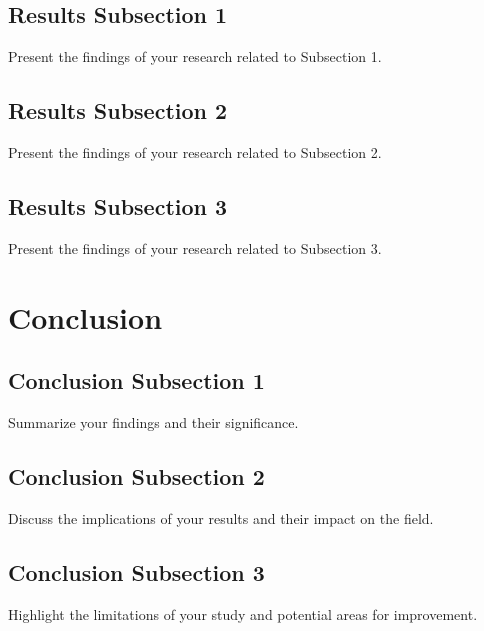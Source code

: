 \documentclass[12pt]{article}
\begin{document}
\subsection{Results Subsection 1}
\label{subsec:results1}

Present the findings of your research related to Subsection 1.

\subsection{Results Subsection 2}
\label{subsec:results2}

Present the findings of your research related to Subsection 2.

\subsection{Results Subsection 3}
\label{subsec:results3}

Present the findings of your research related to Subsection 3.

\section{Conclusion}
\label{sec:conclusion}

\subsection{Conclusion Subsection 1}
\label{subsec:conclusion1}

Summarize your findings and their significance.

\subsection{Conclusion Subsection 2}
\label{subsec:conclusion2}

Discuss the implications of your results and their impact on the field.

\subsection{Conclusion Subsection 3}
\label{subsec:conclusion3}

Highlight the limitations of your study and potential areas for improvement.
\end{document}
